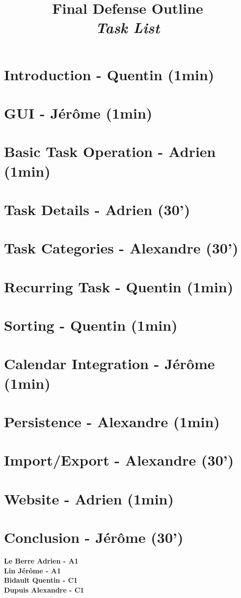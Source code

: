\documentclass{article}
\title{\textbf{Final Defense Outline}\\
\textbf{\textit{Task List}}}
\date{}
\begin{document}
\maketitle
\thispagestyle{empty}

\section{Introduction - Quentin (1min)}
\section{GUI - Jérôme (1min)}
\section{Basic Task Operation - Adrien (1min)}
\section{Task Details - Adrien (30')}
\section{Task Categories - Alexandre (30')}
\section{Recurring Task - Quentin (1min)}
\section{Sorting - Quentin (1min)}
\section{Calendar Integration - Jérôme (1min)}
\section{Persistence - Alexandre (1min)}
\section{Import/Export - Alexandre (30')}
\section{Website - Adrien (1min)}
\section{Conclusion - Jérôme (30')}

\vfill
\begin{center}
    \textbf{Le Berre Adrien - A1}\\
    \textbf{Lin Jérôme - A1}\\
    \textbf{Bidault Quentin - C1}\\
    \textbf{Dupuis Alexandre - C1}\\
\end{center}
\end{document}
